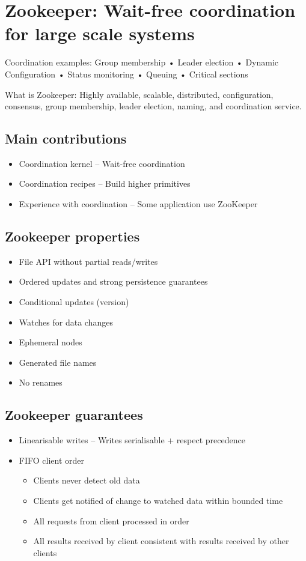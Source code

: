 \chapter{Zookeeper: Wait-free coordination for large scale systems}

Coordination examples: Group membership • Leader election • Dynamic Configuration • Status monitoring • Queuing • Critical sections 

What is Zookeeper: Highly available, scalable, distributed, configuration, consensus, group membership, leader election, naming, and coordination service.

\section{Main contributions}
\begin{itemize}
    \item Coordination kernel – Wait-free coordination
    \item Coordination recipes – Build higher primitives
    \item Experience with coordination – Some application use ZooKeeper
\end{itemize}

\section{Zookeeper properties}
\begin{itemize}
    
    \item File API without partial reads/writes
    \item Ordered updates and strong persistence guarantees
    \item Conditional updates (version)
    \item Watches for data changes
    \item Ephemeral nodes
    \item Generated file names
    \item No renames 
\end{itemize}
    
\section{Zookeeper guarantees}
\begin{itemize}
    \item Linearisable writes – Writes serialisable + respect precedence
    \item FIFO client order 
    \begin{itemize}
        \item Clients never detect old data
        \item Clients get notified of change to watched data within bounded time
        \item All requests from client processed in order
        \item All results received by client consistent with results received by other clients
    \end{itemize}
\end{itemize}

